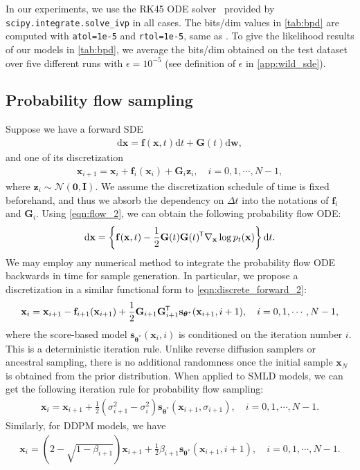 \documentclass{article} %
\newcommand*{\tran}{^{\mkern-1.5mu\mathsf{T}}}
\newcommand{\ud}{\mathrm{d}}
\newcommand{\mcal}{\mathcal}
\newcommand{\bfx}{\mathbf{x}}
\newcommand{\bfw}{\mathbf{w}}
\newcommand{\bfz}{\mathbf{z}}
\newcommand{\bfI}{\mathbf{I}}
\newcommand{\bff}{\mathbf{f}}
\newcommand{\bfzero}{\mathbf{0}}
\newcommand{\bftheta}{{\boldsymbol{\theta}}}
\newcommand{\bfs}{\mathbf{s}}
\newcommand{\bfG}{\mathbf{G}}
\begin{document}
In our experiments, we use the RK45 ODE solver~\citep{dormand1980family} provided by \verb|scipy.integrate.solve_ivp| in all cases. The bits/dim values in \cref{tab:bpd} are computed with \verb|atol=1e-5| and \verb|rtol=1e-5|, same as \citet{grathwohl2018ffjord}. To give the likelihood results of our models in \cref{tab:bpd}, we average the bits/dim obtained on the test dataset over five different runs with $\epsilon=10^{-5}$ (see definition of $\epsilon$ in \cref{app:wild_sde}).

\subsection{Probability flow sampling}\label{app:prob_flow_sampling}
Suppose we have a forward SDE
\begin{align*}
    \ud \bfx = \bff(\bfx, t) \ud t + \bfG(t) \ud \bfw,
\end{align*}
and one of its discretization
\begin{align}
    \bfx_{i+1} = \bfx_i + \bff_i(\bfx_i) + \bfG_i \bfz_i, \quad i = 0, 1, \cdots, N-1, \label{eqn:discrete_forward_2}
\end{align}
where $\bfz_i \sim \mcal{N}(\bfzero, \bfI)$. We assume the discretization schedule of time is fixed beforehand, and thus we absorb the dependency on $\Delta t$ into the notations of $\bff_i$ and $\bfG_i$. Using \cref{eqn:flow_2}, we can obtain the following probability flow ODE:
\begin{align}
    \ud \bfx = \left\{ \bff(\bfx, t) - \frac{1}{2}\bfG(t)\bfG(t)\tran \nabla_\bfx \log p_t(\bfx) \right\} \ud t.
\end{align}
We may employ any numerical method to integrate the probability flow ODE backwards in time for sample generation. In particular, we propose a discretization in a similar functional form to \cref{eqn:discrete_forward_2}:
\begin{align*}
    \bfx_i = \bfx_{i+1} - \bff_{i+1}(\bfx_{i+1}) + \frac{1}{2}\bfG_{i+1}\bfG_{i+1}\tran \bfs_{\bftheta^*}(\bfx_{i+1}, i+1),\quad  i =0,1,\cdots, N-1,
\end{align*}
where the score-based model $\bfs_{\bftheta^*}(\bfx_i, i)$ is conditioned on the iteration number $i$. This is a deterministic iteration rule. Unlike reverse diffusion samplers or ancestral sampling, there is no additional randomness once the initial sample $\bfx_N$ is obtained from the prior distribution. When applied to SMLD models, we can get the following iteration rule for probability flow sampling:
\begin{align}
    \bfx_i = \bfx_{i+1} + \frac{1}{2} (\sigma_{i+1}^2 - \sigma_i^2) \bfs_{{\bftheta^*}}(\bfx_{i+1}, \sigma_{i+1}), \quad i=0,1,\cdots, N-1.
\end{align}
Similarly, for DDPM models, we have
\begin{align}
    \bfx_i = (2 - \sqrt{1 -\beta_{i+1}})\bfx_{i+1} + \frac{1}{2} \beta_{i+1} \bfs_{\bftheta^*}(\bfx_{i+1}, i+1), \quad i=0,1,\cdots, N-1.
\end{align}
\end{document}
